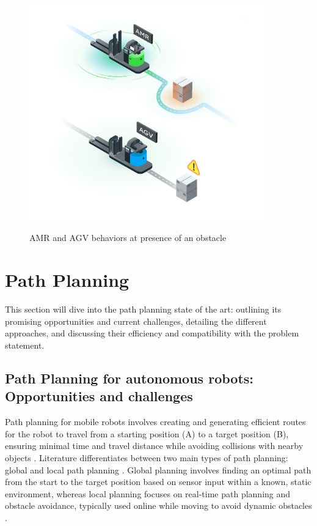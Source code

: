 \begin{figure}[H]
    \begin{center}
       \includegraphics[width=4in]{images/Chap1/AMR-VS-AGV.png}\\
       \caption{AMR and AGV behaviors at presence of an obstacle \cite{R9}}
       \label{AMR-VS-AGV}
       \end{center}
\end{figure}


\section{Path Planning}
This section will dive into the path planning state of the art: outlining its promising 
opportunities and current challenges, detailing the different approaches, and discussing
their efficiency and compatibility with the problem statement.

\subsection{Path Planning for autonomous robots: Opportunities and challenges}
Path planning for mobile robots involves creating and generating efficient routes 
for the robot to travel from a starting position (A) to a target position (B), 
ensuring minimal time and travel distance while avoiding collisions with nearby objects \cite{R7}. Literature 
differentiates between two main types of path planning: 
global and local path planning \cite{R11}. Global planning involves finding an optimal path from 
the start to the target position based on sensor input within a known, static environment, 
whereas local planning focuses on real-time path planning and obstacle avoidance, typically used online while 
moving to avoid dynamic obstacles \cite{R11}.

